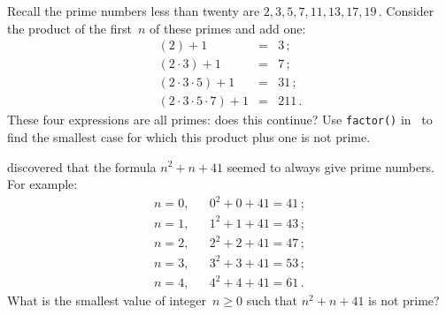 \begin{draft}
\begin{exercise} \label{ex:} 
Recall the prime numbers less than twenty are \(2,3,5,7,11,13,17,19\)\,.
Consider the product of the first~\(n\) of these primes and add one: 
\begin{eqnarray*}
(2)+1&=&3\,;\\
(2\cdot3)+1&=&7\,;\\
(2\cdot3\cdot5)+1&=&31\,;\\
(2\cdot3\cdot5\cdot 7)+1&=&211\,.
\end{eqnarray*}
These four expressions are all primes: does this continue?
Use \verb|factor()| in \script\ to find the smallest case for which this product plus one is not prime.
\end{exercise}




\begin{exercise} \label{ex:} 
 discovered that the formula \(n^2+n+41\) seemed to always give prime numbers.
For example:
\begin{eqnarray*}
n=0,&&0^2+0+41=41\,;\\
n=1,&&1^2+1+41=43\,;\\
n=2,&&2^2+2+41=47\,;\\
n=3,&&3^2+3+41=53\,;\\
n=4,&&4^2+4+41=61\,.
\end{eqnarray*}
What is the smallest value of integer~\(n\geq0\) such that \(n^2+n+41\) is not prime?
\end{exercise}






\begin{comment}%
why, what caused X?
how did X occur?
what-if? what-if-not?
how does X compare with Y?
what is the evidence for X?
why is X important?
\end{comment}





\end{draft}
